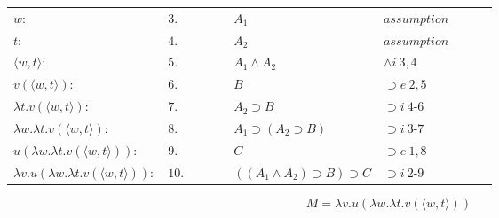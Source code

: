 \documentclass[11pt,a4paper]{article}
\begin{document}
\begin{itemize}
\begin{table}[H]
\begin{tabular}{*{10}{l}}
			\cline{4-9}
			
			$w:$ & $3.$ & \multicolumn{1}{|c}{} & \multicolumn{1}{|c}{} &  & $A_1$ & $assumption$ & & \multicolumn{1}{c|}{} &\multicolumn{1}{c|}{}\\
			
			\cline{5-7}
			
			$t:$ & $4.$ & \multicolumn{1}{|c}{} & \multicolumn{1}{|c}{} & \multicolumn{1}{|c}{} & $A_2$ & $assumption$ & \multicolumn{1}{|c}{} & \multicolumn{1}{c|}{} &\multicolumn{1}{c|}{}\\
			
			$\langle w, t \rangle:$ & $5.$ & \multicolumn{1}{|c}{} & \multicolumn{1}{|c}{} & \multicolumn{1}{|c}{} & $A_1 \land A_2$ & $\land i \ 3, 4$ & \multicolumn{1}{|c}{} & \multicolumn{1}{c|}{} & \multicolumn{1}{c|}{}\\
			
			$v(\langle w, t \rangle):$ & $6.$ & \multicolumn{1}{|c}{} & \multicolumn{1}{|c}{} & \multicolumn{1}{|c}{} & $B$ & $\supset e\ 2, 5$ & \multicolumn{1}{|c}{} & \multicolumn{1}{c|}{} & \multicolumn{1}{c|}{}\\
			
			\cline{5-7}
			
			$\lambda t . v(\langle w, t \rangle):$ & $7.$ & \multicolumn{1}{|c}{} & \multicolumn{1}{|c}{} & & $A_2 \supset B$ & $\supset i \ 4$-$6$ & & \multicolumn{1}{c|}{} & \multicolumn{1}{c|}{}\\
			
			\cline{4-9}
			
			$\lambda w . \lambda t . v(\langle w, t \rangle):$ & $8.$ & \multicolumn{1}{|c}{} & & & $A_1 \supset (A_2 \supset B)$ & $\supset i \ 3$-$7$ & & & \multicolumn{1}{c|}{}\\	
			
			$u(\lambda w . \lambda t . v(\langle w, t \rangle)):$ & $9.$ & \multicolumn{1}{|c}{} & & & $C$ & $\supset e \ 1, 8$ & & & \multicolumn{1}{c|}{}\\		
			\cline{3-10}
			
			$\lambda v . u(\lambda w . \lambda t . v(\langle w, t \rangle)):$ & $10.$ & & & & $((A_1 \wedge A_2) \supset B) \supset C$ & $\supset i \ 2$-$9$ & & & \\
			
		\end{tabular}
		\end{table}
		
		\[ \boxed{M = \lambda v . u(\lambda w . \lambda t . v(\langle w, t \rangle))} \]
		

\end{itemize}
\end{document}
